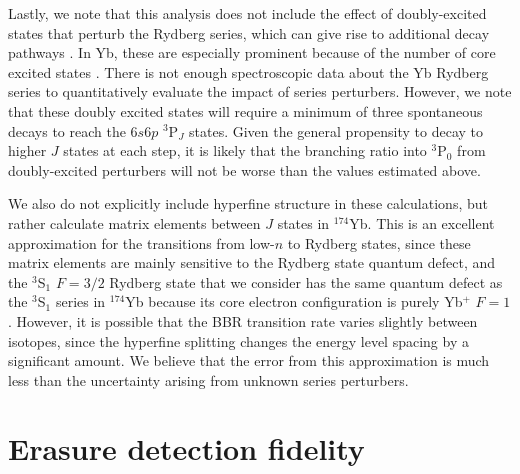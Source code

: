 \documentclass[%
reprint,
superscriptaddress,
 amsmath,amssymb,
 aps,
 prx,
floatfix,
]{revtex4-1}
\begin{document}
Lastly, we note that this analysis does not include the effect of doubly-excited states that perturb the Rydberg series, which can give rise to additional decay pathways \cite{vaillant2014a}. In Yb, these are especially prominent because of the number of core excited states \cite{aymar1984}. There is not enough spectroscopic data about the Yb Rydberg series to quantitatively evaluate the impact of series perturbers. However, we note that these doubly excited states will require a minimum of three spontaneous decays to reach the $6s6p$ $^3$P$_J$ states. Given the general propensity to decay to higher $J$ states at each step, it is likely that the branching ratio into $^3$P$_0$ from doubly-excited perturbers will not be worse than the values estimated above.

We also do not explicitly include hyperfine structure in these calculations, but rather calculate matrix elements between $J$ states in $^{174}$Yb. This is an excellent approximation for the transitions from low-$n$ to Rydberg states, since these matrix elements are mainly sensitive to the Rydberg state quantum defect, and the $^3$S$_1$ $F=3/2$ Rydberg state that we consider has the same quantum defect as the $^3$S$_1$ series in $^{174}$Yb \cite{ma2021} because its core electron configuration is purely Yb$^+$ $F=1$. However, it is possible that the BBR transition rate varies slightly between isotopes, since the hyperfine splitting changes the energy level spacing by a significant amount. We believe that the error from this approximation is much less than the uncertainty arising from unknown series perturbers.

\section{Erasure detection fidelity}
\label{app:detection}
\end{document}

